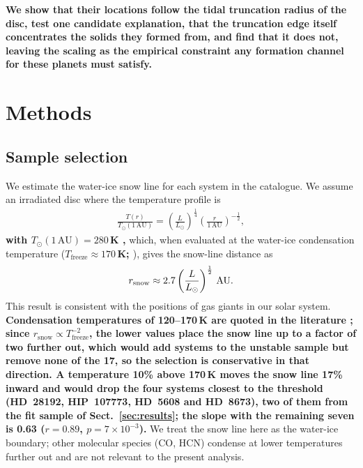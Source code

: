 \documentclass{aa}
\newcommand{\rev}[1]{{\color{red}\textbf{#1}}}
\begin{document}
\rev{We show that their locations follow the tidal truncation radius of
the disc, test one candidate explanation, that the truncation edge itself
concentrates the solids they formed from, and find that it does not,
leaving the scaling as the empirical constraint any formation channel
for these planets must satisfy.}

\section{Methods}
\label{sec:methods}

\subsection{Sample selection}
\label{sec:sample}

We estimate the water-ice snow line for each system in the catalogue.
We assume an irradiated disc where the temperature profile is
\begin{align}
    \frac{T(r)}{T_\odot(1 \, \text{AU})} =
    \left(\frac{L}{L_\odot}\right)^{\frac{1}{4}}
    \left(\frac{r}{1 \, \text{AU}}\right)^{-\frac{1}{2}},
\end{align}
\rev{with $T_\odot(1\,\mathrm{AU}) = 280$\,K \citep{Hayashi1981},}
which, when evaluated at the water-ice condensation temperature
(\rev{$T_\mathrm{freeze} \approx 170$\,K; \citealt{Hayashi1981,
Sasselov2000}}), gives the snow-line distance as
\begin{align}
    r_{\rm snow} \approx 2.7 \left(\frac{L}{L_\odot}\right)^{\frac{1}{2}}
    \, \text{AU}.
\end{align}
This result is consistent with the positions of gas giants in our solar
system. \rev{Condensation temperatures of 120--170\,K are quoted in
the literature \citep{Oberg2011, Sasselov2000}; since
$r_\mathrm{snow} \propto T_\mathrm{freeze}^{-2}$, the lower values place
the snow line up to a factor of two further out, which would add systems
to the unstable sample but remove none of the 17, so the selection is
conservative in that direction. A temperature 10\% above 170\,K moves the
snow line 17\% inward and would drop the four systems closest to the
threshold (HD~28192, HIP~107773, HD~5608 and HD~8673), two of them from
the fit sample of Sect.~\ref{sec:results}; the slope with the remaining
seven is 0.63 ($r = 0.89$, $p = 7\times10^{-3}$).} We treat the snow line here as the water-ice
boundary; other molecular species (CO, HCN) condense at lower
temperatures further out and are not relevant to the present analysis.
\end{document}
